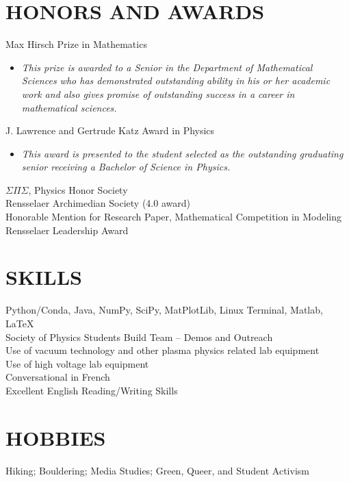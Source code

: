 \documentclass[margin]{rpires}
\begin{document}
\begin{resume}
\section{HONORS AND AWARDS} Max Hirsch Prize in Mathematics
                \begin{itemize}
                    \item[] {\sl This prize is awarded to a Senior in the Department of Mathematical Sciences who has demonstrated outstanding ability in his or her academic work and also gives promise of outstanding success in a career in mathematical sciences.}
                \end{itemize}
                \vspace{-0.4cm}
                J. Lawrence and Gertrude Katz Award in Physics
                \begin{itemize} 
                    \item[] {\sl This award is presented to the student selected as the outstanding graduating senior receiving a Bachelor of Science in Physics.}
                \end{itemize}
                \vspace{-0.4cm}
                $\Sigma \Pi \Sigma$, Physics Honor Society \\
                Rensselaer Archimedian Society (4.0 award) \\
                Honorable Mention for Research Paper,       Mathematical Competition in Modeling \\
                Rensselaer Leadership Award 
 
\section{SKILLS}
Python/Conda, Java, NumPy, SciPy, MatPlotLib, Linux Terminal, Matlab, \LaTeX\\
Society of Physics Students Build Team – Demos and Outreach \\
Use of vacuum technology and other plasma physics related lab equipment\\
Use of high voltage lab equipment\\
Conversational in French\\
Excellent English Reading/Writing Skills \\

 
\section{HOBBIES}
Hiking; Bouldering; Media Studies; Green, Queer, and Student Activism
 
\end{resume} 
\end{document}
